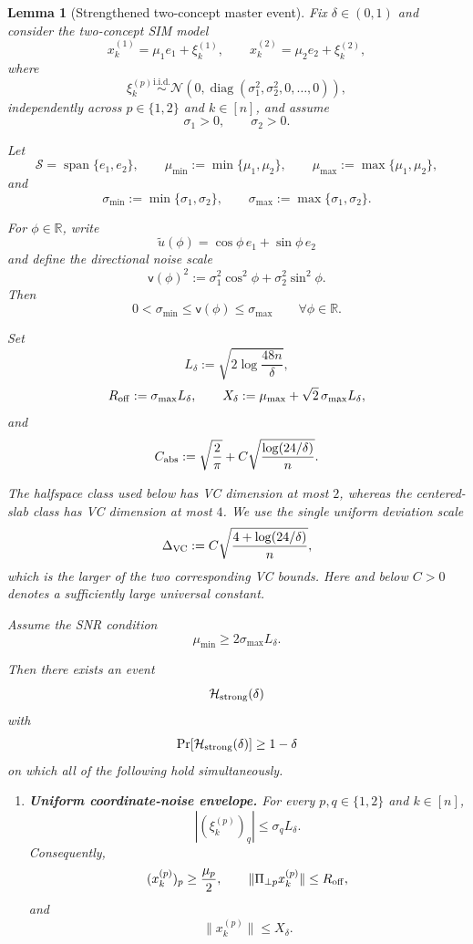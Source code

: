 \documentclass{article} %
\theoremstyle{plain}
\newtheorem{lemma}[theorem]{Lemma}
\theoremstyle{definition}
\theoremstyle{remark}
\begin{document}
\begin{lemma}[Strengthened two-concept master event]
\label{lem:Hstrong}
Fix $\delta\in(0,1)$ and consider the two-concept SIM model
\[
x_k^{(1)}
=
\mu_1 e_1+\xi_k^{(1)},
\qquad
x_k^{(2)}
=
\mu_2 e_2+\xi_k^{(2)},
\]
where
\[
\xi_k^{(p)}
\stackrel{\mathrm{i.i.d.}}{\sim}
\mathcal N
\!\left(
0,
\operatorname{diag}(\sigma_1^2,\sigma_2^2,0,\ldots,0)
\right),
\]
independently across $p\in\{1,2\}$ and $k\in[n]$, and assume
\[
\sigma_1>0,
\qquad
\sigma_2>0.
\]

Let
\[
\mathcal S=\operatorname{span}\{e_1,e_2\},
\qquad
\mu_{\min}:=\min\{\mu_1,\mu_2\},
\qquad
\mu_{\max}:=\max\{\mu_1,\mu_2\},
\]
and
\[
\sigma_{\min}:=\min\{\sigma_1,\sigma_2\},
\qquad
\sigma_{\max}:=\max\{\sigma_1,\sigma_2\}.
\]

For $\phi\in\mathbb R$, write
\[
\widetilde u(\phi)
=
\cos\phi\,e_1+\sin\phi\,e_2
\]
and define the directional noise scale
\[
\mathsf v(\phi)^2
:=
\sigma_1^2\cos^2\phi
+
\sigma_2^2\sin^2\phi.
\]
Then
\[
0<\sigma_{\min}
\le
\mathsf v(\phi)
\le
\sigma_{\max}
\qquad
\forall\phi\in\mathbb R.
\]

Set
\[
L_\delta
:=
\sqrt{2\log\frac{48n}{\delta}},
\]
\[
R_{\rm off}
:=
\sigma_{\max}L_\delta,
\qquad
X_\delta
:=
\mu_{\max}
+
\sqrt{2}\,\sigma_{\max}L_\delta,
\]
and
\[
C_{\rm abs}
:=
\sqrt{\frac2\pi}
+
C
\sqrt{
\frac{\log(24/\delta)}{n}
}.
\]

The halfspace class used below has VC dimension at most $2$, whereas
the centered-slab class has VC dimension at most $4$.  We use the single
uniform deviation scale
\[
\Delta_{\rm VC}
:=
C
\sqrt{
\frac{4+\log(24/\delta)}{n}
},
\]
which is the larger of the two corresponding VC bounds.
Here and below $C>0$ denotes a sufficiently large universal constant.

Assume the SNR condition
\[
\mu_{\min}
\ge
2\sigma_{\max}L_\delta.
\]

Then there exists an event
\[
\mathcal H_{\rm strong}(\delta)
\]
with
\[
\Pr\!\left[
\mathcal H_{\rm strong}(\delta)
\right]
\ge
1-\delta
\]
on which all of the following hold simultaneously.

\begin{enumerate}[label=(\roman*),leftmargin=2.4em]

\item
\textbf{Uniform coordinate-noise envelope.}
For every $p,q\in\{1,2\}$ and $k\in[n]$,
\[
|(\xi_k^{(p)})_q|
\le
\sigma_qL_\delta.
\]
Consequently,
\[
(x_k^{(p)})_p
\ge
\frac{\mu_p}{2},
\qquad
\|\Pi_{\perp p}x_k^{(p)}\|
\le
R_{\rm off},
\]
and
\[
\|x_k^{(p)}\|
\le
X_\delta.
\]


\end{enumerate}
\end{lemma}
\end{document}

